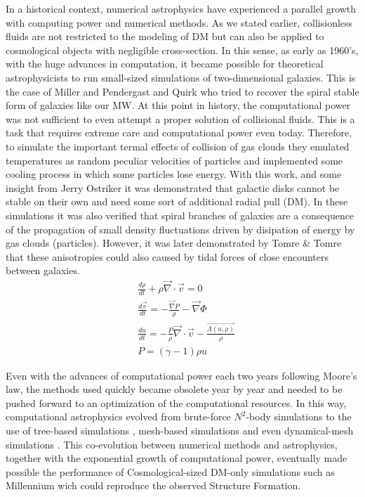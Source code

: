 In a historical context, numerical astrophysics have experienced a parallel growth with computing power and numerical methods. As we stated earlier, collisionless fluids are not restricted to the modeling of DM but can also be applied to cosmological objects with negligible cross-section. In this sense, as early as 1960's, with the huge advances in computation, it became possible for theoretical astrophysicists to run small-sized simulations of two-dimensional galaxies. This is the case of Miller and Pendergast \cite{Miller and Pendergast} and Quirk \cite{MPQ} who tried to recover the spiral stable form of galaxies like our MW. At this point in history, the computational power was not sufficient to even attempt a proper solution of collisional fluids. This is a task that requires extreme care and computational power even today. Therefore, to simulate the important termal effects of collision of gas clouds they emulated temperatures as random peculiar velocities of particles and implemented some cooling process in which some particles lose energy. With this work, and some insight from Jerry Ostriker \cite{JO} it was demonstrated that galactic disks cannot be stable on their own and need some sort of additional radial pull (DM). In these simulations it was also verified that spiral branches of galaxies are a consequence of the propagation of small density fluctuations driven by disipation of energy by gas clouds (particles). However, it was later demonstrated by Tomre \& Tomre \cite{Tomre y Tomre} that these anisotropies could also caused by tidal forces of close encounters between galaxies.\\

\begin{align}
&\frac{d\rho}{dt} + \rho \vec{\nabla}\cdot\vec{v} = 0\\
&\frac{d\vec{v}}{dt} = -\frac{\vec{\nabla}P}{\rho} - \vec{\nabla} \Phi \\
&\frac{du}{dt} = -\frac{P}{\rho}\vec{\nabla}\cdot\vec{v} - \frac{\vec{\Lambda(u,\rho)}}{\rho}\\
& P = (\gamma -1 )\rho u
\label{eq:euler}
\end{align}


Even with the advances of computational power each two years following Moore's law, the methods used quickly became obsolete year by year and needed to be pushed forward to an optimization of the computational resources. In this way, computational astrophysics evolved from brute-force $N^2$-body simulations to the use of tree-based simulations \cite{}, mesh-based simulations \cite{} and even dynamical-mesh simulations \cite{}. This co-evolution between numerical methods and astrophysics, together with the exponential growth of computational power, eventually made possible the performance of Cosmological-sized DM-only simulations such as Millennium wich could reproduce the observed Structure Formation. \\ 

